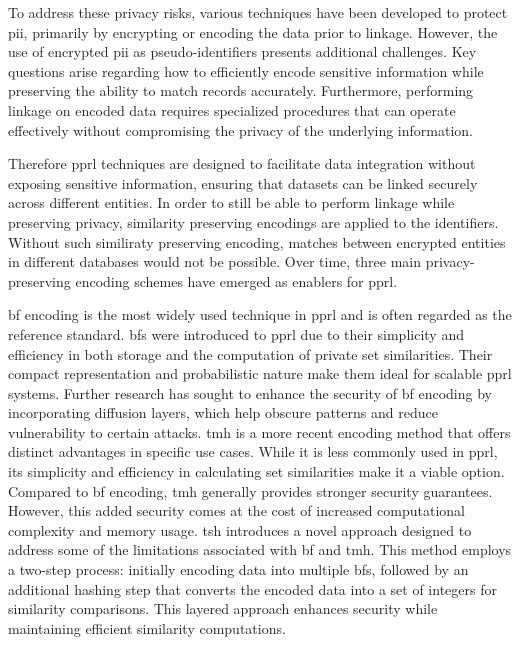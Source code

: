 To address these privacy risks, various techniques have been developed to protect \ac{pii}, primarily by encrypting or encoding the data prior to linkage. 
However, the use of encrypted \ac{pii} as pseudo-identifiers presents additional challenges.
Key questions arise regarding how to efficiently encode sensitive information while preserving the ability to match records accurately. 
Furthermore, performing linkage on encoded data requires specialized procedures that can operate effectively without compromising the privacy of the underlying information.

Therefore \ac{pprl} techniques are designed to facilitate data integration without exposing sensitive information, ensuring that datasets can be linked securely across different entities.
In order to still be able to perform linkage while preserving privacy, similarity preserving encodings are applied to the identifiers.
Without such similiraty preserving encoding, matches between encrypted entities in different databases would not be possible.
Over time, three main privacy-preserving encoding schemes have emerged as enablers for \ac{pprl}. \cite{vidanage2020graph, schaefer2024}

\ac{bf} encoding is the most widely used technique in \ac{pprl} and is often regarded as the reference standard. 
\ac{bf}s were introduced to \ac{pprl} due to their simplicity and efficiency in both storage and the computation of private set similarities. 
Their compact representation and probabilistic nature make them ideal for scalable \ac{pprl} systems.
Further research has sought to enhance the security of \ac{bf} encoding by incorporating diffusion layers, which help obscure patterns and reduce vulnerability to certain attacks. %
\ac{tmh} is a more recent encoding method that offers distinct advantages in specific use cases. 
While it is less commonly used in \ac{pprl}, its simplicity and efficiency in calculating set similarities make it a viable option. 
Compared to \ac{bf} encoding, \ac{tmh} generally provides stronger security guarantees. 
However, this added security comes at the cost of increased computational complexity and memory usage.
\ac{tsh} introduces a novel approach designed to address some of the limitations associated with \ac{bf} and \ac{tmh}. 
This method employs a two-step process: initially encoding data into multiple \ac{bf}s, followed by an additional hashing step that converts the encoded data into a set of integers for similarity comparisons. 
This layered approach enhances security while maintaining efficient similarity computations. \cite{vidanage2020graph, schaefer2024}


